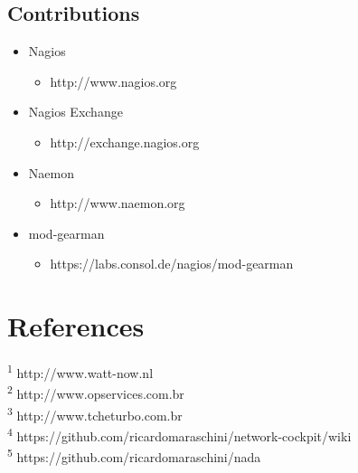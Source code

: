 \documentclass{article}
\begin{document}
\begin{multicols}{2}
\subsection{Contributions}
\begin{itemize}
	\item Nagios
		\begin{itemize}
			\item http://www.nagios.org
		\end{itemize}
	\item Nagios Exchange
		\begin{itemize}
			\item http://exchange.nagios.org
		\end{itemize}
	\item Naemon
		\begin{itemize}
			\item http://www.naemon.org
		\end{itemize}
	\item mod-gearman
		\begin{itemize}
			\item https://labs.consol.de/nagios/mod-gearman
		\end{itemize}
\end{itemize}

\section{References}

\tiny \textsuperscript{1} http://www.watt-now.nl\\
\tiny \textsuperscript{2} http://www.opservices.com.br\\
\tiny \textsuperscript{3} http://www.tcheturbo.com.br\\
\tiny \textsuperscript{4} https://github.com/ricardomaraschini/network-cockpit/wiki\\
\tiny \textsuperscript{5} https://github.com/ricardomaraschini/nada

\end{multicols}
\end{document}

